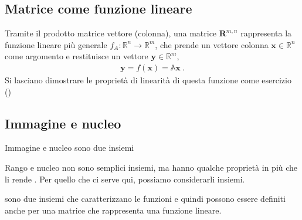 \documentclass[letterpaper,10pt,italian]{jupyterBook}
\begin{document}
\subsection{Matrice come funzione lineare}
\label{\detokenize{ch/algebra/linear-algebra:matrice-come-funzione-lineare}}\label{\detokenize{ch/algebra/linear-algebra:math-hs-algebra-linear-matrices-linear-function}}
\sphinxAtStartPar
Tramite il prodotto matrice vettore (colonna), una matrice \(\mathbf{R}^{m,n}\) rappresenta la funzione lineare più generale \(f_A: \mathbb{R}^n \rightarrow \mathbb{R}^m\), che prende un vettore colonna \(\mathbf{x} \in \mathbb{R}^n\) come argomento e restituisce un vettore \(\mathbf{y} \in \mathbb{R}^m\),
\begin{equation*}
\begin{split}\mathbf{y} = f(\mathbf{x}) = \mathbb{A} \mathbf{x} \ .\end{split}
\end{equation*}
\sphinxAtStartPar
Si lasciano dimostrare le proprietà di linearità di questa funzione come esercizio ()


\subsection{Immagine e nucleo}
\label{\detokenize{ch/algebra/linear-algebra:immagine-e-nucleo}}\label{\detokenize{ch/algebra/linear-algebra:math-hs-algebra-linear-matrices-range-null}}
\sphinxAtStartPar
Immagine e nucleo sono due insiemi%
\begin{footnote}[1]\sphinxAtStartFootnote
Rango e nucleo non sono semplici insiemi, ma hanno qualche proprietà in più che li rende {\hyperref[\detokenize{ch/algebra/vector-algebra-def:math-hs-algebra-vector-def}]{}}. Per quello che ci serve qui, possiamo considerarli insiemi.
%
\end{footnote} sono due insiemi che caratterizzano le funzioni e quindi possono essere definiti anche per una matrice che rappresenta una funzione lineare.
\end{document}

